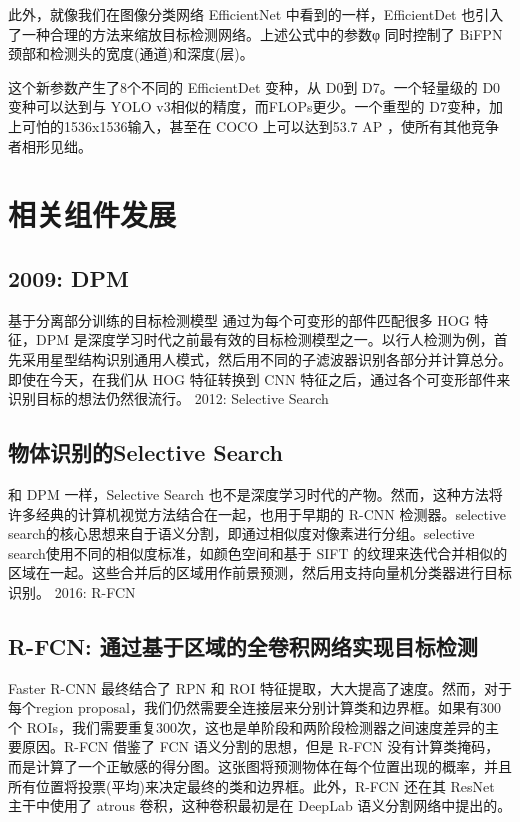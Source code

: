 \documentclass{article}
\begin{document}
	此外，就像我们在图像分类网络 EfficientNet 中看到的一样，EfficientDet 也引入了一种合理的方法来缩放目标检测网络。上述公式中的参数φ 同时控制了 BiFPN 颈部和检测头的宽度(通道)和深度(层)。
	
	这个新参数产生了8个不同的 EfficientDet 变种，从 D0到 D7。一个轻量级的 D0变种可以达到与 YOLO v3相似的精度，而FLOPs更少。一个重型的 D7变种，加上可怕的1536x1536输入，甚至在 COCO 上可以达到53.7 AP ，使所有其他竞争者相形见绌。
	
	\section{相关组件发展}
	\subsection{2009: DPM}
	
	基于分离部分训练的目标检测模型
	通过为每个可变形的部件匹配很多 HOG 特征，DPM 是深度学习时代之前最有效的目标检测模型之一。以行人检测为例，首先采用星型结构识别通用人模式，然后用不同的子滤波器识别各部分并计算总分。即使在今天，在我们从 HOG 特征转换到 CNN 特征之后，通过各个可变形部件来识别目标的想法仍然很流行。
	2012: Selective Search
	
	\subsection{物体识别的Selective Search}
	和 DPM 一样，Selective Search 也不是深度学习时代的产物。然而，这种方法将许多经典的计算机视觉方法结合在一起，也用于早期的 R-CNN 检测器。selective search的核心思想来自于语义分割，即通过相似度对像素进行分组。selective search使用不同的相似度标准，如颜色空间和基于 SIFT 的纹理来迭代合并相似的区域在一起。这些合并后的区域用作前景预测，然后用支持向量机分类器进行目标识别。
	2016: R-FCN
	
	\subsection{R-FCN: 通过基于区域的全卷积网络实现目标检测}
	Faster R-CNN 最终结合了 RPN 和 ROI 特征提取，大大提高了速度。然而，对于每个region proposal，我们仍然需要全连接层来分别计算类和边界框。如果有300个 ROIs，我们需要重复300次，这也是单阶段和两阶段检测器之间速度差异的主要原因。R-FCN 借鉴了 FCN 语义分割的思想，但是 R-FCN 没有计算类掩码，而是计算了一个正敏感的得分图。这张图将预测物体在每个位置出现的概率，并且所有位置将投票(平均)来决定最终的类和边界框。此外，R-FCN 还在其 ResNet 主干中使用了 atrous 卷积，这种卷积最初是在 DeepLab 语义分割网络中提出的。
\end{document}
